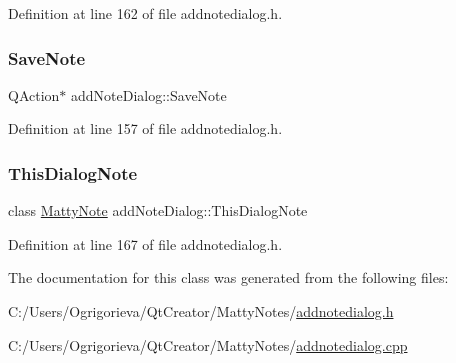 Definition at line 162 of file addnotedialog.\+h.

\hypertarget{classaddNoteDialog_a38a97c60ba07b1c2f606e7e9959829b5}{}\label{classaddNoteDialog_a38a97c60ba07b1c2f606e7e9959829b5} 
\subsubsection{\texorpdfstring{Save\+Note}{SaveNote}}
{\footnotesize\ttfamily Q\+Action$\ast$ add\+Note\+Dialog\+::\+Save\+Note\hspace{0.3cm}{\ttfamily [private]}}



Definition at line 157 of file addnotedialog.\+h.

\hypertarget{classaddNoteDialog_a3bd8efdf8721f0840894f3f5856c6a2b}{}\label{classaddNoteDialog_a3bd8efdf8721f0840894f3f5856c6a2b} 
\subsubsection{\texorpdfstring{This\+Dialog\+Note}{ThisDialogNote}}
{\footnotesize\ttfamily class \hyperlink{classMattyNote}{Matty\+Note} add\+Note\+Dialog\+::\+This\+Dialog\+Note\hspace{0.3cm}{\ttfamily [private]}}



Definition at line 167 of file addnotedialog.\+h.



The documentation for this class was generated from the following files\+:\begin{DoxyCompactItemize}
\item 
C\+:/\+Users/\+Ogrigorieva/\+Qt\+Creator/\+Matty\+Notes/\hyperlink{addnotedialog_8h}{addnotedialog.\+h}\item 
C\+:/\+Users/\+Ogrigorieva/\+Qt\+Creator/\+Matty\+Notes/\hyperlink{addnotedialog_8cpp}{addnotedialog.\+cpp}\end{DoxyCompactItemize}
